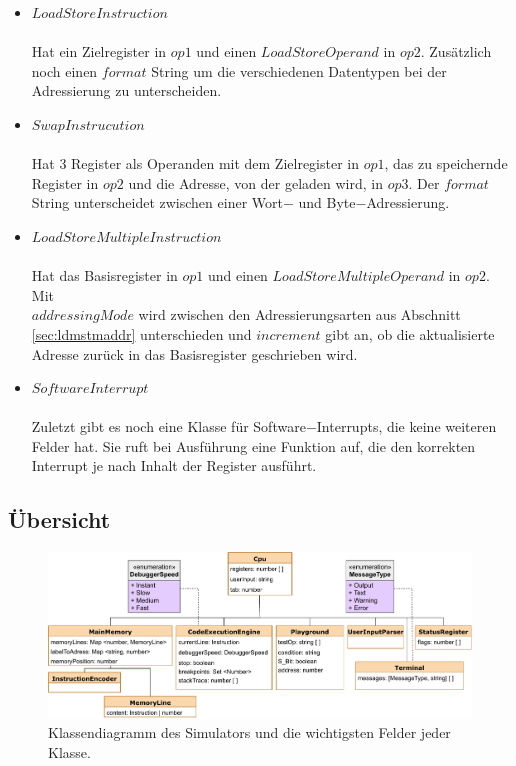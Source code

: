 \documentclass[a4paper, 11pt, onecolumn]{article}
\begin{document}
\begin{itemize}
\item $LoadStoreInstruction$\\ \\Hat ein Zielregister in $op1$ und einen $LoadStoreOperand$ in $op2$. Zusätzlich noch einen $format$ String um die verschiedenen Datentypen bei der Adressierung zu unterscheiden.
\item $SwapInstrucution$\\ \\Hat 3 Register als Operanden mit dem Zielregister in $op1$, das zu speichernde Register in $op2$ und die Adresse, von der geladen wird, in $op3$. Der $format$ String unterscheidet zwischen einer Wort$-$ und Byte$-$Adressierung.
\item $LoadStoreMultipleInstruction$\\ \\Hat das Basisregister in $op1$ und einen $LoadStoreMultipleOperand$ in $op2$. Mit\\$addressingMode$ wird zwischen den Adressierungsarten aus Abschnitt \ref{sec:ldmstmaddr} unterschieden und $increment$ gibt an, ob die aktualisierte Adresse zurück in das Basisregister geschrieben wird.
\item $SoftwareInterrupt$\\ \\Zuletzt gibt es noch eine Klasse für Software$-$Interrupts, die keine weiteren Felder hat. Sie ruft bei Ausführung eine Funktion auf, die den korrekten Interrupt je nach Inhalt der Register ausführt.
\end{itemize} 

\subsection{Übersicht}\label{sec:overview}

\begin{figure}[!htb]
\centering
\includegraphics[width=1\textwidth]{data/classdiagramm}
\caption[Klassendiagramm des Simulator]{Klassendiagramm des Simulators und die wichtigsten Felder jeder Klasse.}
\label{fig:classdiagramm}
\end{figure}
\end{document}
